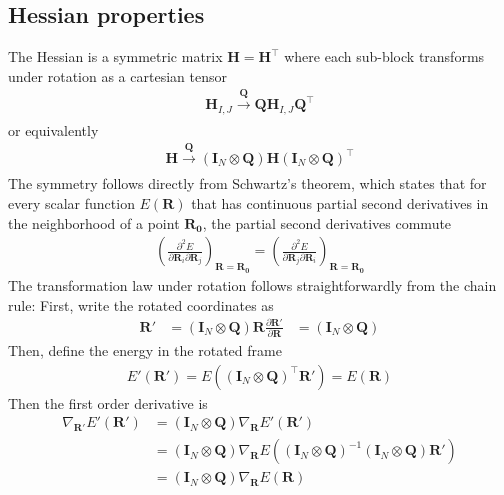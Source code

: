 \documentclass[pdflatex,sn-mathphys-num]{sn-jnl}%
\theoremstyle{thmstyleone}%
\theoremstyle{thmstyletwo}%
\theoremstyle{thmstylethree}%
\begin{document}
\begin{appendices}
\subsection{Hessian properties}
\label{sec:hessian_properties}
The Hessian is a symmetric matrix $\mathbf{H}=\mathbf{H}^\top$ where each sub-block transforms under rotation as a cartesian tensor
\begin{align}
    \mathbf{H}_{I,J} \xrightarrow[]{\mathbf{Q}} \mathbf{Q} \mathbf{H}_{I,J} \mathbf{Q}^\top 
\end{align}
or equivalently
\begin{align}
    \mathbf{H} \xrightarrow[]{\mathbf{Q}} (\mathbf{I}_{N} \otimes \mathbf{Q})\mathbf{H} (\mathbf{I}_{N} \otimes \mathbf{Q})^\top 
\end{align}
The symmetry follows directly from Schwartz's theorem, which states that for every scalar function $E(\mathbf{R})$ that has continuous partial second derivatives in the neighborhood of a point $\mathbf{R_0}$, the partial second derivatives commute
\begin{align}
    \left(\frac{\partial^2 E}{\partial \mathbf{R}_i \partial \mathbf{R}_j}\right)_{\mathbf{R}=\mathbf{R_0}} = \left(\frac{\partial^2 E}{\partial \mathbf{R}_j \partial \mathbf{R}_i}\right)_{\mathbf{R}=\mathbf{R_0}}
\end{align}
The transformation law under rotation follows straightforwardly from the chain rule: 
First, write the rotated coordinates as
\begin{align}
    \mathbf{R}' &= (\mathbf{I}_{N} \otimes \mathbf{Q}) \mathbf{R} 
    \frac{\partial \mathbf{R}'}{\partial \mathbf{R}} &= (\mathbf{I}_{N} \otimes \mathbf{Q})
\end{align}
Then, define the energy in the rotated frame
\begin{align}
    E'(\mathbf{R}') = E((\mathbf{I}_{N} \otimes \mathbf{Q})^\top \mathbf{R}') = E(\mathbf{R})
\end{align}
Then the first order derivative is
\begin{align}
    \nabla_\mathbf{R'}E'(\mathbf{R'}) &= (\mathbf{I}_{N} \otimes \mathbf{Q}) \nabla_\mathbf{R} E'(\mathbf{R}') \\
    &= (\mathbf{I}_{N} \otimes \mathbf{Q}) \nabla_\mathbf{R} E((\mathbf{I}_{N} \otimes \mathbf{Q})^{-1} (\mathbf{I}_{N} \otimes \mathbf{Q}) \mathbf{R}') \\
    &= (\mathbf{I}_{N} \otimes \mathbf{Q}) \nabla_\mathbf{R} E(\mathbf{R})
\end{align}

\end{appendices}
\end{document}
